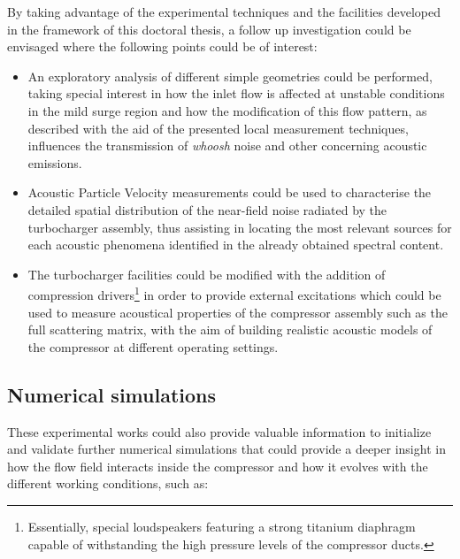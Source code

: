 By taking advantage of the experimental techniques and the facilities developed in the framework of this doctoral thesis, a follow up investigation could be envisaged where the following points could be of interest:

\begin{itemize}
	\item An exploratory analysis of different simple geometries could be performed, taking special interest in how the inlet flow is affected at unstable conditions in the mild surge region and how the modification of this flow pattern, as described with the aid of the presented local measurement techniques, influences the transmission of \emph{whoosh} noise and other concerning acoustic emissions.

	\item Acoustic Particle Velocity measurements could be used to characterise the detailed spatial distribution of the near-field noise radiated by the turbocharger assembly, thus assisting in locating the most relevant sources for each acoustic phenomena identified in the already obtained spectral content.

	\item The turbocharger facilities could be modified with the addition of compression drivers\footnote{Essentially, special loudspeakers featuring a strong titanium diaphragm capable of withstanding the high pressure levels of the compressor ducts.} in order to provide external excitations which could be used to measure acoustical properties of the compressor assembly such as the full scattering matrix, with the aim of building realistic acoustic models of the compressor at different operating settings.
\end{itemize}

\subsection{Numerical simulations}

These experimental works could also provide valuable information to initialize and validate further numerical simulations that could provide a deeper insight in how the flow field interacts inside the compressor and how it evolves with the different working conditions, such as:

